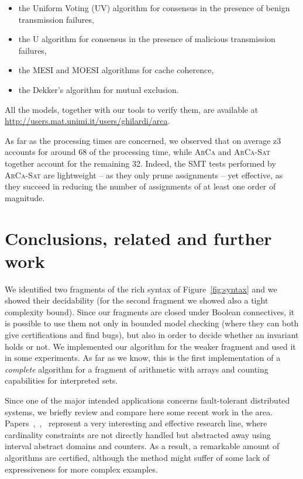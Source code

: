 \documentclass[11pt,a4paper]{article}
\begin{document}
{\begin{itemize}
\item the Uniform Voting (UV) algorithm \cite{heardof} for consensus in the presence of benign transmission failures, 
\item the U algorithm \cite{Biely07} for consensus in the presence of malicious transmission failures, 
\item the MESI \cite{Patel84} and MOESI \cite{MOESI} algorithms for cache coherence,
\item the Dekker's algorithm \cite{Dekker} for mutual exclusion. 
\end{itemize}
All the models, together with our tools to verify them, are available at \url{http://users.mat.unimi.it/users/ghilardi/arca}.

As far as the processing times are concerned, we observed that on average z3 accounts for around 68 of the processing time, while \textsc{ArCa} and \textsc{ArCa-Sat} together account for the remaining 32.
Indeed, the SMT tests performed by \textsc{ArCa-Sat} are lightweight -- as they only prune assignments -- yet effective, as they succeed in reducing the number of assignments of at least one order of magnitude. 
 
\section{Conclusions, related and further work}\label{sec:conclusions}

We identified two  fragments of the rich syntax of Figure~\ref{fig:syntax} 
and we showed their decidability (for the second fragment we showed also a tight complexity bound). Since our fragments are closed under Boolean connectives, it is possible to use them not only in  bounded model checking
(where they can both give certifications and find bugs), but also
in order to decide whether an invariant holds or not. We implemented our algorithm for the weaker fragment and used it in some experiments.
As far as we know, this is the first implementation of a \emph{complete} algorithm for a fragment of arithmetic with arrays and counting capabilities for interpreted sets.   
 
 Since one of the major intended applications concerns fault-tolerant distributed systems, we  briefly review and compare here some recent work in the area.
Papers~\cite{konnov_cav},~\cite{konnov_concur},~\cite{konnov_fmcad} represent a very interesting and effective research line, where cardinality constraints are not directly handled but abstracted away 
using interval abstract domains and counters. As a result, a remarkable amount of algorithms are certified, although the method might suffer of some lack of expressiveness for more complex examples.

}
\end{document}
